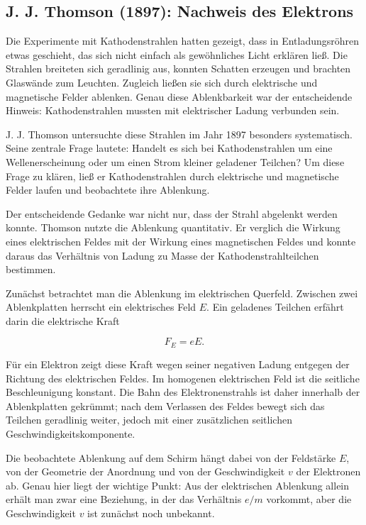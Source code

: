 \subsection{J. J. Thomson (1897): Nachweis des Elektrons}
\label{sec:thomson-nachweis-elektron}

Die Experimente mit Kathodenstrahlen hatten gezeigt,
dass in Entladungsröhren etwas geschieht, das sich
nicht einfach als gewöhnliches Licht erklären ließ. Die Strahlen breiteten
sich geradlinig aus, konnten Schatten erzeugen und brachten Glaswände zum
Leuchten. Zugleich ließen sie sich durch elektrische und magnetische Felder
 ablenken. Genau diese
Ablenkbarkeit war der entscheidende Hinweis: Kathodenstrahlen mussten mit
elektrischer Ladung verbunden sein.

J. J. Thomson untersuchte diese Strahlen im Jahr 1897
besonders systematisch. Seine zentrale Frage lautete: Handelt es sich bei
Kathodenstrahlen um eine Wellenerscheinung oder um einen Strom kleiner
geladener Teilchen? Um diese Frage zu klären, ließ er Kathodenstrahlen durch
elektrische und magnetische Felder laufen und beobachtete ihre Ablenkung.

Der entscheidende Gedanke war nicht nur, dass der Strahl abgelenkt werden
konnte. Thomson nutzte die Ablenkung quantitativ. Er verglich die Wirkung
eines elektrischen Feldes mit der Wirkung eines magnetischen Feldes und
konnte daraus das Verhältnis von Ladung zu Masse der Kathodenstrahlteilchen
bestimmen.

Zunächst betrachtet man die Ablenkung im elektrischen Querfeld. Zwischen zwei
Ablenkplatten herrscht ein elektrisches Feld \(E\). Ein geladenes Teilchen
erfährt darin die elektrische Kraft

\[
F_E = eE.
\]

Für ein Elektron zeigt diese Kraft wegen seiner negativen Ladung entgegen der
Richtung des elektrischen Feldes. Im homogenen elektrischen Feld ist die
seitliche Beschleunigung konstant. Die Bahn des Elektronenstrahls ist daher
innerhalb der Ablenkplatten gekrümmt; nach dem Verlassen des Feldes bewegt
sich das Teilchen geradlinig weiter, jedoch mit einer zusätzlichen seitlichen
Geschwindigkeitskomponente.

Die beobachtete Ablenkung auf dem Schirm hängt dabei von der Feldstärke \(E\),
von der Geometrie der Anordnung und von der Geschwindigkeit \(v\) der
Elektronen ab. Genau hier liegt der wichtige Punkt: Aus der elektrischen
Ablenkung allein erhält man zwar eine Beziehung, in der das Verhältnis
\(e/m\) vorkommt, aber die Geschwindigkeit \(v\) ist zunächst noch unbekannt.

